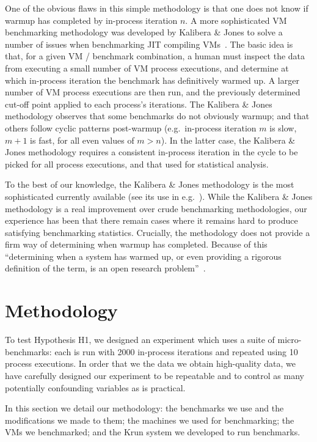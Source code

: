 \documentclass[a4paper,UKenglish]{lipics}
\newcommand{\kalibera}{Kalibera \& Jones\xspace}
\newcommand{\krun}{Krun\xspace}
\begin{document}
One of the obvious flaws in this simple methodology is that one does not know if warmup
has completed by in-process iteration $n$. A more sophisticated VM benchmarking methodology
was developed by \kalibera to solve a number of issues when benchmarking JIT
compiling VMs~\cite{kalibera12quantifying,kalibera13rigorous}. The basic idea is
that, for a given VM / benchmark combination, a human must inspect the data from
executing a small number of VM process executions, and determine at which in-process iteration the
benchmark has definitively warmed up. A larger number of VM process executions are then
run, and the previously determined cut-off point applied to each process's
iterations. The \kalibera methodology observes that some benchmarks do not
obviously warmup; and that others follow cyclic patterns post-warmup
(e.g.~in-process iteration $m$ is slow, $m+1$ is fast, for all even values of $m > n$). In
the latter case, the \kalibera methodology requires a consistent in-process iteration in
the cycle to be picked for all process executions, and that used for statistical analysis.

To the best of our knowledge, the \kalibera methodology is the most
sophisticated currently available (see its use in
e.g.~\cite{barrett15approaches,grimmer15dynamically}). While the \kalibera
methodology is a real improvement over crude benchmarking methodologies,
our experience has been that there remain cases where it remains hard to produce
satisfying benchmarking statistics. Crucially, the methodology does not
provide a firm way of determining when warmup has completed. Because of this
``determining when a system has warmed up, or even providing a
rigorous definition of the term, is an open research problem''~\cite{seaton15phd}.


\section{Methodology}
\label{sec:methodology}

To test Hypothesis H1, we designed an experiment which uses a suite of
micro-benchmarks: each is run with 2000 in-process iterations and repeated
using 10 process executions. In order
that we the data we obtain high-quality data, we have carefully designed our
experiment to be repeatable and to control as many potentially confounding variables as
is practical.

In this section we detail our methodology: the benchmarks we use and the
modifications we made to them; the machines we used for benchmarking; the VMs we
benchmarked; and the \krun system we developed to run benchmarks.
\end{document}
